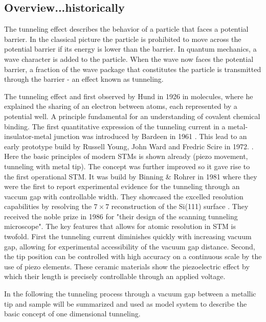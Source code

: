 \subsection{Overview...historically}
The tunneling effect describes the behavior of a particle that faces a potential barrier. In the classical picture the particle is prohibited to move across the potential barrier if its energy is lower than the barrier. In quantum mechanics, a wave character is added to the particle. When the wave now faces the potential barrier, a fraction of the wave package that constitutes the particle is transmitted through the barrier - an effect known as tunneling.

The tunneling effect and first observed by Hund in 1926 \cite{Mehra_tunneling_1982} in molecules, where  he explained the sharing of an electron between atoms, each represented by a potential well. A principle fundamental for an understanding of covalent chemical binding. The first quantitative expression of the tunneling current in a metal-insulator-metal junction was introduced by Bardeen in 1961 \cite{Bardeen_tunneling_1961}. This lead to an early prototype build by Russell Young, John Ward and Fredric Scire in 1972. \cite{Young_topographiner_1972}. Here the basic principles of modern STMs is shown already (piezo movement, tunneling with metal tip). The concept was further improved so it gave rise to the first operational STM. It was build by Binning \& Rohrer in 1981 \cite{binning_tunneling_1982} where they were the first to report experimental evidence for the tunneling through an vaccum gap with controllable width. They showcased the excelled resolution capabilities by resolving the $7 \times 7$ reconstruction of the Si(111) surface \cite{binnig_1983}. They received the noble prize in 1986 \cite{_noble_price_1986} for "their design of the scanning tunneling microscope". The key features that allows for atomic resolution in STM is twofold. First the tunneling current diminishes quickly with increasing vacuum gap, allowing for experimental accessibility of the vacuum gap distance. Second, the tip position can be controlled with high accuracy on a continuous scale by the use of piezo elements. These ceramic materials show the piezoelectric effect \cite{Martin_Piezo_1972} by which their length is precisely controllable through an applied voltage.

In the following the tunneling process through a vacuum gap between a metallic tip and sample will be summarized and used as model system to describe the basic concept of one dimensional tunneling.

